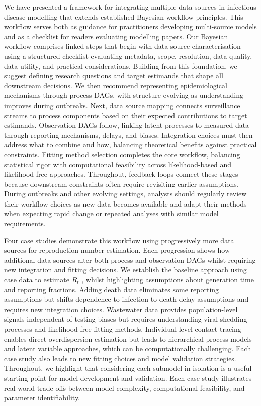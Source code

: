 \documentclass{article}
\begin{document}
We have presented a framework for integrating multiple data sources in infectious disease modelling that extends established Bayesian workflow principles.
This workflow serves both as guidance for practitioners developing multi-source models and as a checklist for readers evaluating modelling papers.
Our Bayesian workflow comprises linked steps that begin with data source characterisation using a structured checklist evaluating metadata, scope, resolution, data quality, data utility, and practical considerations.
Building from this foundation, we suggest defining research questions and target estimands that shape all downstream decisions.
We then recommend representing epidemiological mechanisms through process DAGs, with structure evolving as understanding improves during outbreaks.
Next, data source mapping connects surveillance streams to process components based on their expected contributions to target estimands.
Observation DAGs follow, linking latent processes to measured data through reporting mechanisms, delays, and biases.
Integration choices must then address what to combine and how, balancing theoretical benefits against practical constraints.
Fitting method selection completes the core workflow, balancing statistical rigor with computational feasibility across likelihood-based and likelihood-free approaches.
Throughout, feedback loops connect these stages because downstream constraints often require revisiting earlier assumptions.
During outbreaks and other evolving settings, analysts should regularly review their workflow choices as new data becomes available and adapt their methods when expecting rapid change or repeated analyses with similar model requirements.

Four case studies demonstrate this workflow using progressively more data sources for reproduction number estimation.
Each progression shows how additional data sources alter both process and observation DAGs whilst requiring new integration and fitting decisions.
We establish the baseline approach using case data to estimate $R_t$ , whilst highlighting assumptions about generation time and reporting fractions.
Adding death data eliminates some reporting assumptions but shifts dependence to infection-to-death delay assumptions and requires new integration choices.
Wastewater data provides population-level signals independent of testing biases but requires understanding viral shedding processes and likelihood-free fitting methods.
Individual-level contact tracing enables direct overdispersion estimation but leads to hierarchical process models and latent variable approaches, which can be computationally challenging.
Each case study also leads to new fitting choices and model validation strategies.
Throughout, we highlight that considering each submodel in isolation is a useful starting point for model development and validation.
Each case study illustrates real-world trade-offs between model complexity, computational feasibility, and parameter identifiability.
\end{document}

